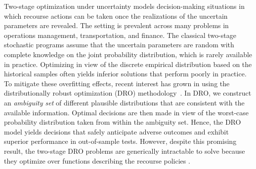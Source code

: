 \documentclass{article}
\begin{document}
Two-stage  optimization  under uncertainty models decision-making situations in which recourse actions can be taken once the realizations of the uncertain parameters are revealed. The setting is prevalent across many problems in operations management, transportation, and finance. 
The classical two-stage stochastic programs  assume that the uncertain parameters are random with complete knowledge on the joint probability distribution, which is rarely available in practice. Optimizing in view of the discrete empirical distribution based on the historical samples often yields inferior solutions that perform poorly in practice. To mitigate these overfitting effects, recent interest has grown in using the distributionally robust optimization (DRO) methodology~\cite{ DRO-solution-2, two-stage-sampling-robust, DRO-solution-3, DRO-tractable-1, Wass-SDP, DRO-solution-1}. In DRO, we construct an \emph{ambiguity set} of different plausible distributions that are consistent with the available information. Optimal decisions are then made in view of the worst-case probability distribution taken from within the ambiguity set. 
Hence, the DRO model yields  decisions that safely anticipate adverse outcomes and exhibit superior performance in out-of-sample tests. However, despite this promising result, the two-stage DRO problems are generically intractable to solve because they optimize over functions describing the recourse policies \cite{DRO-NPhard}. 


\end{document}
